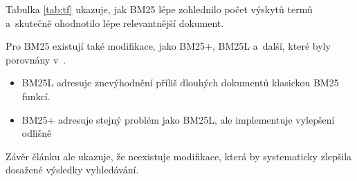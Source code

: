 Tabulka \ref{tab:tf} ukazuje, jak BM25 lépe zohlednilo počet výskytů termů a~skutečně ohodnotilo lépe relevantnější dokument.\par \medskip
Pro BM25 existují také modifikace, jako BM25+, BM25L a~další, které byly porovnány v~\cite{bm25_improvements}.\par
\begin{itemize}
    \item BM25L \cite{bm25_too_long} adresuje znevýhodnění příliš dlouhých dokumentů klasickou BM25 funkcí.
    \item BM25+ \cite{bm25_plus} adresuje stejný problém jako BM25L, ale implementuje vylepšení odlišně
\end{itemize}
Závěr článku \cite{bm25_improvements} ale ukazuje, že neexistuje modifikace, která by systematicky zlepšila dosažené výsledky vyhledávání.\par



